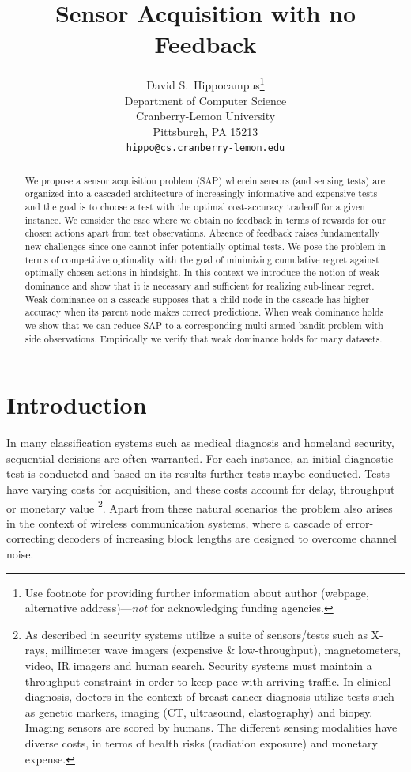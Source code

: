 \documentclass{article}
\title{Sensor Acquisition with no Feedback}
\author{
	David S.~Hippocampus\thanks{Use footnote for providing further
		information about author (webpage, alternative
		address)---\emph{not} for acknowledging funding agencies.} \\
	Department of Computer Science\\
	Cranberry-Lemon University\\
	Pittsburgh, PA 15213 \\
	\texttt{hippo@cs.cranberry-lemon.edu} \\
}
\begin{document}
	
	\maketitle
	
	\begin{abstract}
		We propose a sensor acquisition problem (SAP) wherein sensors (and sensing tests) are organized into a cascaded architecture of increasingly informative and expensive tests and the goal is to choose a test with the optimal cost-accuracy tradeoff for a given instance. We consider the case where we obtain no feedback in terms of rewards for our chosen actions apart from test observations. Absence of feedback raises fundamentally new challenges since one cannot infer potentially optimal tests. We pose the problem in terms of competitive optimality with the goal of minimizing cumulative regret against optimally chosen actions in hindsight. In this context we introduce the notion of weak dominance and show that it is necessary and sufficient for realizing sub-linear regret. Weak dominance on a cascade supposes that a child node in the cascade has higher accuracy when its parent node makes correct predictions. When weak dominance holds we show that we can reduce SAP to a corresponding multi-armed bandit problem with side observations. Empirically we verify that weak dominance holds for many datasets.
	\end{abstract}

\section{Introduction}
In many classification systems  such as medical diagnosis  and  homeland  security,  sequential decisions  are  often  warranted.   For each  instance,  an initial diagnostic test  is conducted and based on its results further tests maybe conducted. Tests have varying  costs for  acquisition,  and  these  costs  account  for delay,  throughput  or  monetary  value \footnote{As described in \cite{Trapeznikov} security systems utilize a suite of sensors/tests such as X-rays, millimeter wave imagers (expensive \& low-throughput), magnetometers, video, IR imagers and human search.  Security systems  must  maintain  a  throughput  constraint  in  order to  keep  pace  with  arriving  traffic.   In  clinical  diagnosis, doctors  in the context of breast cancer diagnosis utilize tests such as genetic markers, imaging (CT, ultrasound, elastography) and biopsy. Imaging sensors are scored by humans. The different sensing  modalities  have  diverse  costs,  in  terms  of  health risks (radiation exposure) and monetary expense.}. Apart from these natural scenarios the problem also arises in the context of wireless communication systems, where a cascade of error-correcting decoders of increasing block lengths are designed to overcome channel noise. 
\end{document}
